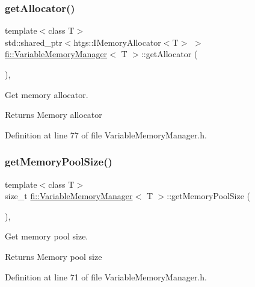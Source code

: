 \subsubsection{\texorpdfstring{get\+Allocator()}{getAllocator()}}
{\footnotesize\ttfamily template$<$class T$>$ \\
std\+::shared\+\_\+ptr$<$htgs\+::\+I\+Memory\+Allocator$<$T$>$ $>$ \hyperlink{classfi_1_1VariableMemoryManager}{fi\+::\+Variable\+Memory\+Manager}$<$ T $>$\+::get\+Allocator (\begin{DoxyParamCaption}{ }\end{DoxyParamCaption})\hspace{0.3cm}{\ttfamily [inline]}, {\ttfamily [override]}}



Get memory allocator. 

\begin{DoxyReturn}{Returns}
Memory allocator 
\end{DoxyReturn}


Definition at line 77 of file Variable\+Memory\+Manager.\+h.

\mbox{\label{classfi_1_1VariableMemoryManager_a781ac82a7b0c437ef36f1d17b31e4d3d}} 
\subsubsection{\texorpdfstring{get\+Memory\+Pool\+Size()}{getMemoryPoolSize()}}
{\footnotesize\ttfamily template$<$class T$>$ \\
size\+\_\+t \hyperlink{classfi_1_1VariableMemoryManager}{fi\+::\+Variable\+Memory\+Manager}$<$ T $>$\+::get\+Memory\+Pool\+Size (\begin{DoxyParamCaption}{ }\end{DoxyParamCaption})\hspace{0.3cm}{\ttfamily [inline]}, {\ttfamily [override]}}



Get memory pool size. 

\begin{DoxyReturn}{Returns}
Memory pool size 
\end{DoxyReturn}


Definition at line 71 of file Variable\+Memory\+Manager.\+h.

